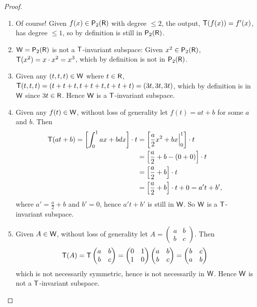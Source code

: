 \begin{proof} \ 

\begin{enumerate}
\item Of course! Given \(f(x) \in \textsf{P}_2(\textsf{R})\) with degree \(\le 2\), the output, \(\textsf{T}(f(x)) = f'(x)\), has degree \(\le 1\), so by definition is still in \(\textsf{P}_2(\textsf{R})\).

\item \(\textsf{W} = \textsf{P}_2(\textsf{R})\) is not a \(\textsf{T}\)-invariant subspace: Given \(x^2 \in \textsf{P}_2(\textsf{R})\), \(\textsf{T}(x^2) = x \cdot x^2 = x^3\), which by definition is not in \(\textsf{P}_2(\textsf{R})\).

\item Given any \((t, t, t) \in \textsf{W}\) where \(t \in \textsf{R}\), \(\textsf{T}(t, t, t) = (t + t + t, t + t + t, t + t + t) = (3t, 3t, 3t)\), which by definition is in \(\textsf{W}\) since \(3t \in \textsf{R}\).
Hence \(\textsf{W}\) is a \(\textsf{T}\)-invariant subspace.

\item Given any \(f(t) \in \textsf{W}\), without loss of generality let \(f(t) = at + b\) for some \(a\) and \(b\).
Then
\begin{align*}
    \textsf{T}(at + b) = \left[ \int_0^1 ax + b dx \right] \cdot t
    & = \left[ \frac{a}{2} x^2 + bx \Big|_0^1 \right] \cdot t \\
    & = \left[ \frac{a}{2} + b - (0 + 0) \right] \cdot t \\
    & = \left[ \frac{a}{2} + b \right] \cdot t \\
    & = \left[ \frac{a}{2} + b \right] \cdot t + 0 = a't + b',
\end{align*}
where \(a' = \frac{a}{2} + b\) and \(b' = 0\), hence \(a't + b'\) is still in \(\textsf{W}\).
So \(\textsf{W}\) is a \(\textsf{T}\)-invariant subspace.

\item Given \(A \in \textsf{W}\), without loss of generality let \(A = \begin{pmatrix} a & b \\ b & c \end{pmatrix}\).
Then
\begin{align*}
    \textsf{T}(A) = \textsf{T} \begin{pmatrix} a & b \\ b & c \end{pmatrix}
          = \begin{pmatrix} 0 & 1 \\ 1 & 0 \end{pmatrix} \begin{pmatrix} a & b \\ b & c \end{pmatrix}
          = \begin{pmatrix} b & c \\ a & b \end{pmatrix}
\end{align*}
which is not necessarily symmetric, hence is not necessarily in \(\textsf{W}\).
Hence \(\textsf{W}\) is not a \(\textsf{T}\)-invariant subspace.
\end{enumerate}
\end{proof}

